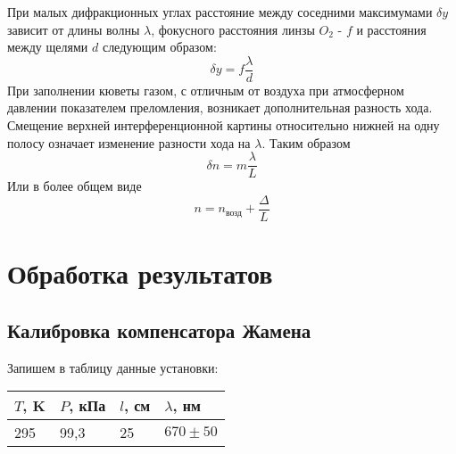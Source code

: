 При малых дифракционных углах расстояние между соседними максимумами $\delta y$ зависит от длины волны $\lambda$, фокусного расстояния линзы $O_2$ - $f$ и расстояния между щелями $d$ следующим образом:
\begin{equation*}
 \delta y = f\frac{\lambda}{d}
\end{equation*} 
 При заполнении кюветы газом, с отличным от воздуха при атмосферном давлении показателем преломления, возникает дополнительная разность хода. Смещение верхней интерференционной картины относительно нижней на одну полосу означает изменение разности хода на $\lambda$. Таким образом
 \begin{equation*}
 	\delta n = m\frac{\lambda}{L}
 \end{equation*}
Или в более общем виде
\begin{equation*}
	n = n_\text{возд} + \frac{\Delta}{L}
\end{equation*}

\section{Обработка результатов}

\subsection{Калибровка компенсатора Жамена}
	Запишем в таблицу данные установки:
	\begin{table}[H]
		\centering
		\begin{tabular}{|l|l|l|l|}
			\hline
			$T$, K & $P$, кПа & $l$, см & $\lambda$, нм \\ \hline
			295    & 99,3     & 25      & $670 \pm 50$  \\ \hline
		\end{tabular}
	\end{table}

